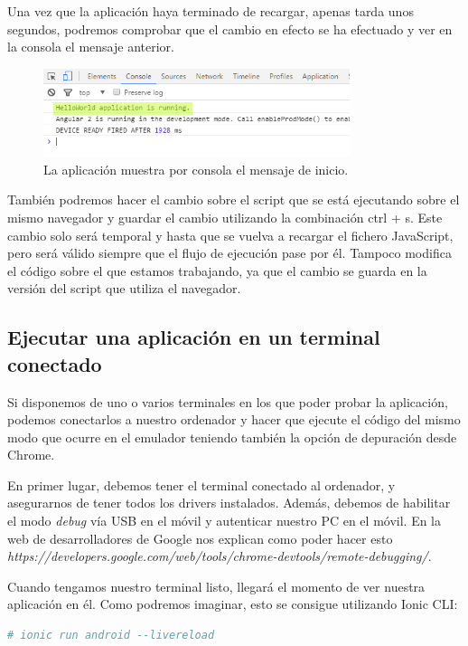 Una vez que la aplicación haya terminado de recargar, apenas tarda unos segundos, podremos comprobar que el cambio en efecto se ha efectuado y ver en la consola el mensaje anterior.

\begin{figure}[H]
\centering
    \centering
        \includegraphics[width=0.8\textwidth]{Figures/ch2/BuildAndEmulate/state_log}
    \caption{La aplicación muestra por consola el mensaje de inicio.}
\end{figure}

También podremos hacer el cambio sobre el script que se está ejecutando sobre el mismo navegador y guardar el cambio utilizando la combinación ctrl + s. Este cambio solo será temporal y hasta que se vuelva a recargar el fichero JavaScript, pero será válido siempre que el flujo de ejecución pase por él. Tampoco modifica el código sobre el que estamos trabajando, ya que el cambio se guarda en la versión del script que utiliza el navegador.

\subsection{Ejecutar una aplicación en un terminal conectado} \label{subsec:runInDevice}

Si disponemos de uno o varios terminales en los que poder probar la aplicación, podemos conectarlos a nuestro ordenador y hacer que ejecute el código del mismo modo que ocurre en el emulador teniendo también la opción de depuración desde Chrome.

En primer lugar, debemos tener el terminal conectado al ordenador, y asegurarnos de tener todos los drivers instalados. Además, debemos de habilitar el modo \emph{debug} vía \gls{USB} en el móvil y autenticar nuestro PC en el móvil. En la web de desarrolladores de Google nos explican como poder hacer esto \emph{https://developers.google.com/web/tools/chrome-devtools/remote-debugging/}.

Cuando tengamos nuestro terminal listo, llegará el momento de ver nuestra aplicación en él. Como podremos imaginar, esto se consigue utilizando Ionic CLI:

\begin{lstlisting}[language=bash]
  # ionic run android --livereload
\end{lstlisting}

